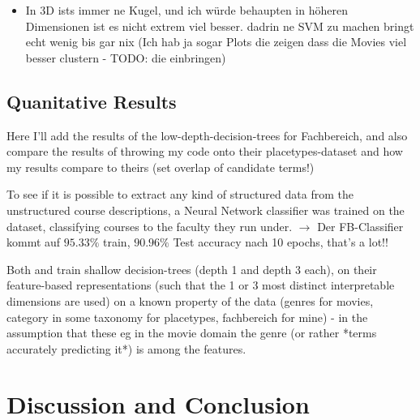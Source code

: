 \documentclass[11pt,
  paper=a4, 
  hidelinks,
  bibliography=totocnumbered,
	captions=tableheading,
	BCOR=10mm
]{scrreprt}
\theoremstyle{definition}
\begin{document}
\begin{itemize}
	\item In 3D ists immer ne Kugel, und ich würde behaupten in höheren Dimensionen ist es nicht extrem viel besser. dadrin ne SVM zu machen bringt echt wenig bis gar nix (Ich hab ja sogar Plots die zeigen dass die Movies viel besser clustern - TODO: die einbringen)
\end{itemize}


\section{Quanitative Results}


Here I'll add the results of the low-depth-decision-trees for Fachbereich, and also compare the results of throwing my code onto their placetypes-dataset and how my results compare to theirs 
(set overlap of candidate terms!)

To see if it is possible to extract any kind of structured data from the unstructured course descriptions, a Neural Network classifier was trained on the dataset, classifying courses to the faculty they run under. 
$\rightarrow$ Der FB-Classifier kommt auf $95.33\%$ train, $90.96\%$ Test accuracy nach 10 epochs, that's a lot!!


Both \cite{Ager2018} and \cite{Alshaikh2020} train shallow decision-trees (depth 1 and depth 3 each), on their feature-based representations (such that the 1 or 3 most distinct interpretable dimensions are used) on a known property of the data (genres for movies, category in some taxonomy for placetypes, fachbereich for mine) - in the assumption that these eg in the movie domain the genre (or rather *terms accurately predicting it*) is among the features.



\chapter{Discussion and Conclusion}
\end{document}
